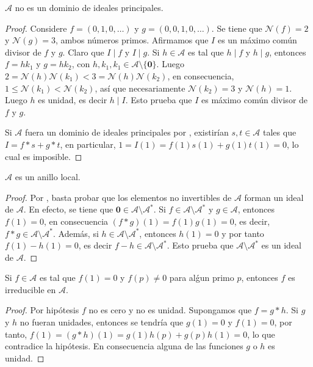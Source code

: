 \begin{proposition}
$\mathcal{A}$ no es un dominio de ideales principales.
\end{proposition}
\begin{proof}
Considere $f=(0,1,0,\ldots)$ y $g=(0,0,1,0,\ldots)$. Se tiene que $\mathcal{N}(f)=2$ y $\mathcal{N}(g)=3$, ambos números primos. Afirmamos que $I$ es un máximo común divisor de $f$ y $g$. Claro que $I \mid f$ y $I \mid g$. Si $h \in \mathcal{A}$ es tal que $h \mid f$ y $h \mid g$, entonces $f=h k_1$ y $g=h k_2$, con $h,k_1,k_1 \in \mathcal{A}\setminus \{ \mathbf{0} \}$. Luego $2=\mathcal{N}(h)\mathcal{N}(k_1)<3=\mathcal{N}(h)\mathcal{N}(k_2)$, en consecuencia, $1 \le \mathcal{N}(k_1)<\mathcal{N}(k_2)$, así que necesariamente $\mathcal{N}(k_2)=3$ y $\mathcal{N}(h)=1$. Luego $h$ es unidad, es decir $h \mid I$. Esto prueba que $I$ es máximo común divisor de $f$ y $g$.
\bigskip

Si $\mathcal{A}$ fuera un dominio de ideales principales por \cite[\S III.3, Thm. 3.11.(ii), p. 140]{Hun1}, existirían $s,t \in \mathcal{A}$ tales que $I=f*s+g*t$, en particular, $1=I(1)=f(1)s(1)+g(1)t(1)=0$, lo cual es imposible.
\end{proof}

\begin{theorem}
$\mathcal{A}$ es un anillo local.
\end{theorem}
\begin{proof}
Por \cite[\S III.4, Thm. 4.13.(iii), p. 147]{Hun1}, basta probar que los elementos no invertibles de $\mathcal{A}$ forman un ideal de $\mathcal{A}$. En efecto, se tiene que $\mathbf{0} \in \mathcal{A}\setminus \mathcal{A}^*$. Si $f \in \mathcal{A}\setminus \mathcal{A}^*$ y $g \in \mathcal{A}$, entonces $f(1)=0$, en consecuencia $(f*g)(1)=f(1)g(1)=0$, es decir, $f*g \in \mathcal{A}\setminus \mathcal{A}^*$. Además, si $h \in \mathcal{A}\setminus \mathcal{A}^*$, entonces $h(1)=0$ y por tanto $f(1)-h(1)=0$, es decir $f-h \in \mathcal{A}\setminus \mathcal{A}^*$. Esto prueba que $\mathcal{A}\setminus \mathcal{A}^*$ es un ideal de $\mathcal{A}$.
\end{proof}

\begin{proposition}
Si $f \in \mathcal{A}$ es tal que $f(1) = 0$ y $f(p) \ne 0$ para alǵun primo $p$, entonces $f$ es irreducible en $\mathcal{A}$.
\end{proposition}
\begin{proof}
Por hipótesis $f$ no es cero y no es unidad. Supongamos que $f=g*h$. Si $g$ y $h$ no fueran unidades, entonces se tendría que $g(1)=0$ y $f(1)=0$, por tanto, $f(1)=(g*h)(1)=g(1)h(p)+g(p)h(1)=0$, lo que contradice la hipótesis. En consecuencia alguna de las funciones $g$ o $h$ es unidad.
\end{proof}


